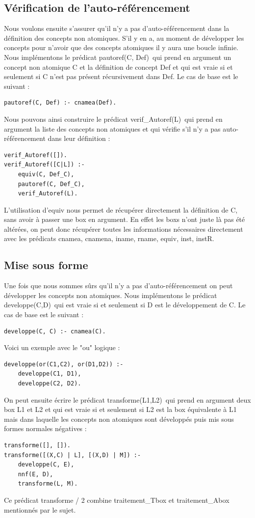 \documentclass{article}
\begin{document}
\subsection{Vérification de l'auto-référencement}
Nous voulons ensuite s'assurer qu'il n'y a pas d'auto-référencement dans la définition des concepts non atomiques. S'il y en a, au moment de développer les concepts pour n'avoir que des concepts atomiques il y aura une boucle infinie. Nous implémentons le prédicat \color{blue}pautoref(C, Def)\color{black}\ qui prend en argument un concept non atomique C et la définition de concept Def et qui est vraie si et seulement si C n'est pas présent récursivement dans Def. Le cas de base est le suivant :
\begin{verbatim}
pautoref(C, Def) :- cnamea(Def).
\end{verbatim}

Nous pouvons ainsi construire le prédicat \color{blue}verif\_Autoref(L)\color{black}\ qui prend en argument la liste des concepts non atomiques et qui vérifie s'il n'y a pas auto-référencement dans leur définition : 
\begin{verbatim}
verif_Autoref([]).
verif_Autoref([C|L]) :-
	equiv(C, Def_C),
	pautoref(C, Def_C),
	verif_Autoref(L).
\end{verbatim}
L'utilisation d'equiv nous permet de récupérer directement la définition de C, sans avoir à passer une box en argument. En effet les boxs n'ont juste là pas été altérées, on peut donc récupérer toutes les informations nécessaires directement avec les prédicats  \color{blue}cnamea, cnamena, iname, rname, equiv, inst, instR\color{black}.

\subsection{Mise sous forme}
Une fois que nous sommes sûrs qu'il n'y a pas d'auto-référencement on peut développer les concepts non atomiques. Nous implémentons le prédicat \color{blue}developpe(C,D)\color{black}\ qui est vraie si et seulement si D est le développement de C. Le cas de base est le suivant : 
\begin{verbatim}
developpe(C, C) :- cnamea(C).
\end{verbatim}
Voici un exemple avec le "ou" logique :
\begin{verbatim}
developpe(or(C1,C2), or(D1,D2)) :- 
	developpe(C1, D1), 
	developpe(C2, D2).
\end{verbatim}
On peut ensuite écrire le prédicat \color{blue}transforme(L1,L2)\color{black}\ qui prend en argument deux box L1 et L2 et qui est vraie si et seulement si L2 est la box équivalente à L1 mais dans laquelle les concepts non atomiques sont développés puis mis sous formes normales négatives :
\begin{verbatim}
transforme([], []).
transforme([(X,C) | L], [(X,D) | M]) :- 
	developpe(C, E),
	nnf(E, D),
	transforme(L, M).
\end{verbatim}
Ce prédicat \color{blue} transforme / 2 \color{black} combine \color{blue} traitement\_Tbox \color{black} et \color{blue} traitement\_Abox \color{black} mentionnés par le sujet.
\end{document}

